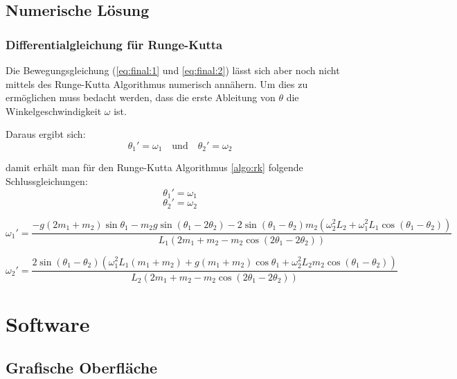\documentclass[12pt]{article}
\numberwithin{equation}{subsection}
\begin{document}
\subsection{Numerische Lösung}
\subsubsection{Differentialgleichung für Runge-Kutta}
Die Bewegungsgleichung (\ref{eq:final:1} und \ref{eq:final:2}) lässt sich aber noch nicht mittels des Runge-Kutta Algorithmus numerisch annähern. Um dies zu ermöglichen muss bedacht werden, dass die erste Ableitung von $\theta$ die Winkelgeschwindigkeit $\omega$ ist.

Daraus ergibt sich:
\begin{equation*}
	\theta_1' = \omega_1 \quad \text{und} \quad \theta_2' = \omega_2
\end{equation*}

damit erhält man für den Runge-Kutta Algorithmus \ref{algo:rk} folgende Schlussgleichungen:
\begin{equation} \label{eq:rk:1}
	\theta_1' = \omega_1
\end{equation}
\begin{equation} \label{eq:rk:2}
	\theta_2' = \omega_2
\end{equation}

\begin{equation} \label{eq:rk:3}
	\omega_1' = \frac{-g(2m_1+m_2)\sin\theta_1 - m_2 g \sin(\theta_1 - 2\theta_2) -2\sin(\theta_1 - \theta_2)m_2(\omega_2^2 L_2 + \omega_1^2 L_1\cos(\theta_1 - \theta_2))}
	{L_1(2m_1 + m_2 - m_2 \cos(2\theta_1 - 2\theta_2))}
\end{equation}

\begin{equation} \label{eq:rk:4}
	\omega_2' = \frac{2\sin(\theta_1 - \theta_2)(\omega_1^2 L_1(m_1 + m_2) + g(m_1 + m_2)\cos\theta_1 + \omega_2^2 L_2 m_2 \cos(\theta_1 - \theta_2))}
	{L_2 (2m_1 + m_2 - m_2 \cos(2 \theta_1 - 2\theta_2))}
\end{equation}

\newpage
\section{Software}
\subsection{Grafische Oberfläche}
\end{document}
